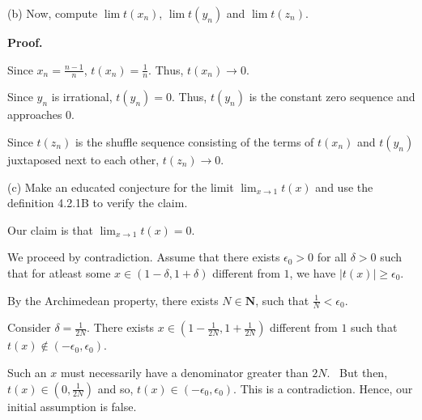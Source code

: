 \documentclass[10pt]{article}
\begin{document}
(b) Now, compute $\displaystyle \lim t( x_{n})$, $\displaystyle \lim t( y_{n})$ and $\displaystyle \lim t( z_{n})$.



\textbf{Proof.}



Since $\displaystyle x_{n} =\frac{n-1}{n}$, $\displaystyle t( x_{n}) =\frac{1}{n}$. Thus, $\displaystyle t( x_{n})\rightarrow 0$. 



Since $\displaystyle y_{n}$ is irrational, $\displaystyle t( y_{n}) =0$. Thus, $\displaystyle t( y_{n})$ is the constant zero sequence and approaches $\displaystyle 0$. 



Since $\displaystyle t( z_{n})$ is the shuffle sequence consisting of the terms of $\displaystyle t( x_{n})$ and $\displaystyle t( y_{n})$ juxtaposed next to each other, $\displaystyle t( z_{n})\rightarrow 0$.



(c) Make an educated conjecture for the limit $\displaystyle \lim _{x\rightarrow 1} t( x)$ and use the definition 4.2.1B to verify the claim. 



Our claim is that $\displaystyle \lim _{x\rightarrow 1} t( x) =0$. 



We proceed by contradiction. Assume that there exists $\displaystyle \epsilon _{0}  >0$ for all $\displaystyle \delta  >0$ such that for atleast some $\displaystyle x\in ( 1-\delta ,1+\delta )$ different from $\displaystyle 1$, we have $\displaystyle |t( x) |\geq \epsilon _{0}$. 



By the Archimedean property, there exists $\displaystyle N\in \mathbf{N}$, such that $\displaystyle \frac{1}{N} < \epsilon _{0}$. 



Consider $\displaystyle \delta =\frac{1}{2N}$. There exists $\displaystyle x\in \left( 1-\frac{1}{2N} ,1+\frac{1}{2N}\right)$ different from $\displaystyle 1$ such that $\displaystyle t( x) \notin ( -\epsilon _{0} ,\epsilon _{0})$. 



Such an $\displaystyle x$ must necessarily have a denominator greater than $\displaystyle 2N$. \ But then, $\displaystyle t( x) \in \left( 0,\frac{1}{2N}\right)$ and so, $\displaystyle t( x) \in ( -\epsilon _{0} ,\epsilon _{0})$. This is a contradiction. Hence, our initial assumption is false.
\end{document}
